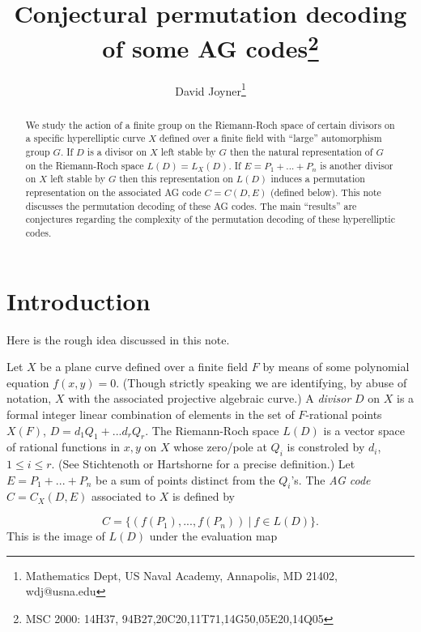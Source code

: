 \documentclass[12pt]{article}
\numberwithin{equation}{section}
\begin{document}
\author{David Joyner\thanks{Mathematics Dept, 
US Naval Academy, Annapolis, MD 21402,
wdj@usna.edu}}

\title{Conjectural permutation decoding of some AG codes\thanks{MSC 2000: 
14H37, 94B27,20C20,11T71,14G50,05E20,14Q05}}

\maketitle

\begin{abstract}
We study the action of a finite group on the Riemann-Roch
space of certain divisors on a specific hyperelliptic curve
$X$ defined over a finite field with ``large'' automorphism group
$G$. If $D$ is a divisor on $X$ left stable by $G$ then 
the natural representation of $G$ on the Riemann-Roch space 
$L(D)=L_X(D)$. If $E=P_1+...+P_n$ is another
divisor on $X$ left stable by $G$ then this representation on
$L(D)$ induces a permutation representation on the
associated AG code $C=C(D,E)$ (defined below).
This note discusses the permutation decoding of these AG codes.
The main ``results'' are conjectures regarding the complexity of 
the permutation decoding of these hyperelliptic codes. 
\end{abstract}


\section{Introduction}

Here is the rough idea discussed in this note.

Let $X$ be a plane curve defined over a finite field
$F$ by means of some polynomial equation $f(x,y)=0$.
(Though strictly speaking we are identifying,
by abuse of notation, $X$ with the associated projective 
algebraic curve.) 
A {\it divisor} $D$ on $X$ is a formal integer linear
combination of elements in the set of $F$-rational
points $X(F)$, $D=d_1Q_1+...d_rQ_r$. The Riemann-Roch
space $L(D)$ is a vector space of rational functions 
in $x,y$ on $X$ whose zero/pole at $Q_i$ is
constroled by $d_i$, $1\leq i\leq r$. (See Stichtenoth
\cite{Sti} or Hartshorne \cite{H} for a precise definition.)
Let $E=P_1+...+P_n$ be a sum of points distinct from the
$Q_i$'s. The {\it AG code} $C=C_X(D,E)$ associated to $X$ is 
defined by 

\begin{equation}
\label{eqn:AGcode}
C=\{(f(P_1),...,f(P_n))\ |\ f\in L(D)\}.
\end{equation}
This is the image of $L(D)$ under the evaluation map
\end{document}
